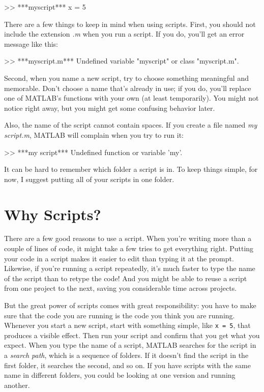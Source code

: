 \begin{code}
>> ***myscript***
x = 5
\end{code}

There are a few things to keep in mind when using scripts. First, you should not include the extension \emph{.m} when you run a script.  If you do, you'll get an error message like this:

\begin{code}
>> ***myscript.m***
Undefined variable "myscript" or class "myscript.m".
\end{code}

Second, when you name a new script, try to choose something meaningful and memorable.
Don't choose a name that's already in use; if you do, you'll replace one of MATLAB's functions with your own (at least temporarily). 
You might not notice right away, but you might get some confusing behavior later.


Also, the name of the script cannot contain spaces.  If you create
a file named \emph{my script.m}, MATLAB will complain when you try
to run it:

\begin{code}
>> ***my script***
Undefined function or variable 'my'.
\end{code}

It can be hard to remember which folder a script is in.  To keep things simple,
for now, I suggest putting all of your scripts in one folder.

\section{Why Scripts?}

There are a few good reasons to use a script. When you're writing more than a couple of lines of code, it might take a few tries to get everything right.  Putting your code
in a script makes it easier to edit than typing it at the prompt. Likewise, if you're running a script repeatedly, it's much faster to type the name of the script than to retype the code! And you might be able to reuse a script from one project to the next, saving you considerable time across projects.



But the great power of scripts comes with great responsibility: you have to make sure that the code you are running is the code you think you are running.
Whenever you start a new script, start with something simple, like \lstinline{x = 5}, that produces a visible effect. Then run your script and confirm that you get what you expect.
When you type the name of a script, MATLAB searches for the script in a \emph{search path}, which is a sequence of folders.  If it doesn't find the script in the first folder, it searches the second, and so on.
If you have scripts with the same name in different folders, you could be looking at one version and running another.

